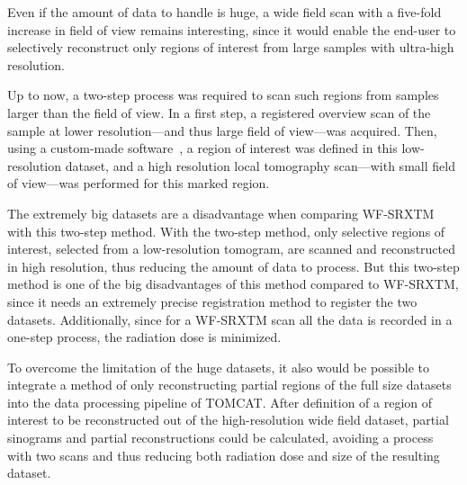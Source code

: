 Even if the amount of data to handle is huge, a wide field scan with a five-fold increase in field of view remains interesting, since it would enable the end-user to selectively reconstruct only regions of interest from large samples with ultra-high resolution.

Up to now, a two-step process was required to scan such regions from samples larger than the field of view. In a first step, a registered overview scan of the sample at lower resolution---and thus large field of view---was acquired. Then, using a custom-made software~\cite{Heinzer2008}, a region of interest was defined in this low-resolution dataset, and a high resolution local tomography scan---with small field of view---was performed for this marked region.

The extremely big datasets are a disadvantage when comparing WF-SRXTM with this two-step method. With the two-step method, only selective regions of interest, selected from a low-resolution tomogram, are scanned and reconstructed in high resolution, thus reducing the amount of data to process. But this two-step method is one of the big disadvantages of this method compared to WF-SRXTM, since it needs an extremely precise registration method to register the two datasets. Additionally, since for a WF-SRXTM scan all the data is recorded in a one-step process, the radiation dose is minimized. 

To overcome the limitation of the huge datasets, it also would be possible to integrate a method of only reconstructing partial regions of the full size datasets into the data processing pipeline of TOMCAT. After definition of a region of interest to be reconstructed out of the high-resolution wide field dataset, partial sinograms and partial reconstructions could be calculated, avoiding a process with two scans and thus reducing both radiation dose and size of the resulting dataset.